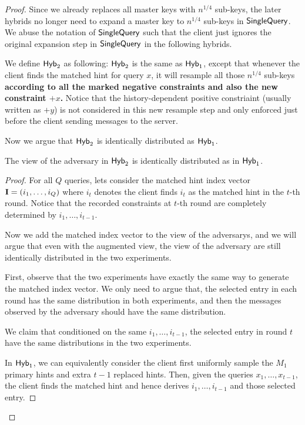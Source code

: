 \begin{proof}
    Since we already replaces all master keys with $n^{1/4}$ sub-keys, the later hybrids no longer need to expand a master key to $n^{1/4}$ sub-keys in $\mathsf{SingleQuery}$. We abuse the notation of $\mathsf{SingleQuery}$ such that the client just ignores the original expansion step in $\mathsf{SingleQuery}$ in the following hybrids. %
    
    We define ${\sf Hyb}_2$ as following: ${\sf Hyb}_2$ is the same as ${\sf Hyb}_1$, except that whenever the client finds the matched hint for query $x$, it will resample all those $n^{1/4}$ sub-keys \textbf{according to all the marked negative constraints and also the new constraint $+x$.} Notice that the history-dependent positive constriaint (usually written as $+y$) is not considered in this new resample step and only enforced just before the client sending messages to the server. 
    
    Now we argue that ${\sf Hyb}_2$ is identically distributed as ${\sf Hyb}_1$. 
    
    \begin{myclaim}
        The view of the adversary in ${\sf Hyb}_2$ is identically distributed as in ${\sf Hyb}_1$. 
        \label{clm:resamp-const}
    \end{myclaim}
    
    \begin{proof}
        For all $Q$ queries, lets consider the matched hint index vector ${\bf I}=(i_1,\dots,
        i_Q)$ where $i_t$ denotes the client finds $i_t$ as the matched hint in the $t$-th round. Notice that the recorded constraints at $t$-th round are completely determined by $i_1,\dots,i_{t-1}$.
        
        Now we add the matched index vector to the view of the adversarys, and we will argue that even with the augmented view, the view of the adversary are still identically distributed in the two experiments.
        
        First, observe that the two experiments have exactly the same way to generate the matched index vector.
        We only need to argue that, the selected entry in each round has the same distribution in both experiments, and then the messages observed by the adversary should have the same distribution.
        
        We claim that conditioned on the same $i_1,\dots,i_{t-1}$, the selected entry in round $t$ have the same distributions in the two experiments.
        
        In ${\sf Hyb}_1$, we can equivalently consider the client first uniformly sample the $M_1$ primary hints and extra $t-1$ replaced hints.
        Then, given the queries $x_1,\dots,x_{t-1}$, the client finds the matched hint and hence derives $i_1,\dots,i_{t-1}$ and those selected entry.
        

\end{proof}
\end{proof}
